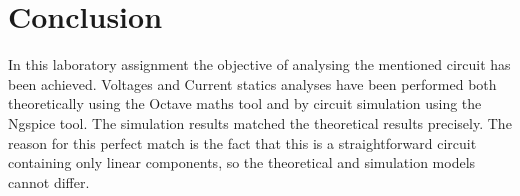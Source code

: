 \section{Conclusion}
\label{sec:conclusion}

In this laboratory assignment the objective of analysing the mentioned circuit has been
achieved. Voltages and Current statics analyses have been performed both
theoretically using the Octave maths tool and by circuit simulation using the
Ngspice tool. The simulation results matched the theoretical results
precisely. The reason for this perfect match is the fact that this is a
straightforward circuit containing only linear components, so the theoretical
and simulation models cannot differ.

\lipsum[1-1]
